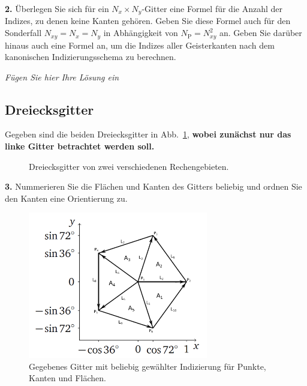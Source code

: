 \documentclass[Protokollheft.tex]{subfiles}
\begin{document}
        \begin{framed}
	\noindent \textbf{2.} \label{vorb:formel} Überlegen Sie sich für ein $N_x\times N_y$-Gitter eine Formel für die
        Anzahl der Indizes, zu denen keine Kanten gehören. Geben Sie diese Formel auch für den Sonderfall
        $N_{xy}=N_x=N_y$ in Abhängigkeit von $N_{\text{P}}=N_{xy}^2$ an. Geben Sie darüber hinaus auch eine Formel an, um die Indizes aller Geisterkanten nach dem kanonischen Indizierungsschema zu berechnen.\label{exer:nrOfGhostEdges}
\end{framed}

\emph{Fügen Sie hier Ihre Lösung ein}

%
    {\subsection{Dreiecksgitter}}
    Gegeben sind die beiden Dreiecksgitter in Abb.~\ref{fig:tetmesh}, \textbf{wobei
    zunächst nur das linke Gitter betrachtet werden soll.}
  \begin{figure}[htb]
    \centering
    \begin{subfigure}{0.49\textwidth}
        \centering
                    
    \end{subfigure}
    \begin{subfigure}{0.49\textwidth}
        \centering
        
    \end{subfigure}
    \caption{Dreiecksgitter von zwei verschiedenen Rechengebieten.}
    \label{fig:tetmesh}
  \end{figure}

        \begin{framed}
	\noindent \textbf{3.} Nummerieren Sie die Flächen und Kanten des Gitters beliebig und ordnen
                    Sie den Kanten eine Orientierung zu.\label{exer:triangleOrderedNumbering}
\end{framed}


\begin{figure}[h]
	\centering
	\includegraphics[width=0.7\textwidth]{Raster_2.png}
	\caption{Gegebenes Gitter mit beliebig gewählter Indizierung für Punkte, Kanten und Flächen.}
	\label{abb::5-eck}
\end{figure}
\end{document}
